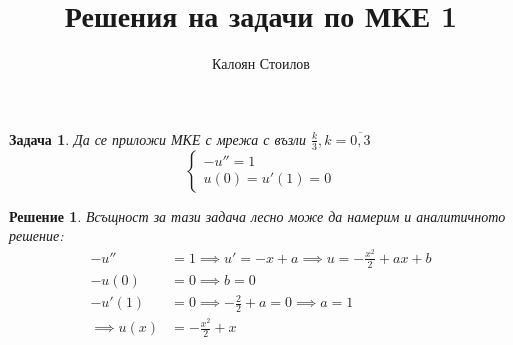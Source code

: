 \documentclass[12pt]{article}
\title{Решения на задачи по МКЕ 1}
\author{Калоян Стоилов}
\newtheorem{problem}{Задача}
\newtheorem*{solution*}{Решение}
\begin{document}
\maketitle
\begin{large}
  \begin{problem}
    Да се приложи МКЕ с мрежа с възли $\frac{k}{3}, k=\overline{0,3}$
    \begin{equation}
      \begin{cases}
        -u'' = 1 \\
        u\left(0\right)=u'\left(1\right)=0
      \end{cases}
    \end{equation}
  \end{problem}

  \begin{solution*}
    Всъщност за тази задача лесно може да намерим и аналитичното решение:
    \begin{align*}
      -u'' &= 1 \implies u' = -x + a \implies u = -\frac{x^2}{2} + ax + b \\
      -u\left(0\right) &= 0 \implies b = 0 \\
      -u'\left(1\right) &= 0 \implies -\frac{2}{2} + a = 0 \implies a=1 \\
      \implies u(x) &= -\frac{x^2}{2}+x
    \end{align*}


\end{solution*}
\end{large}
\end{document}
